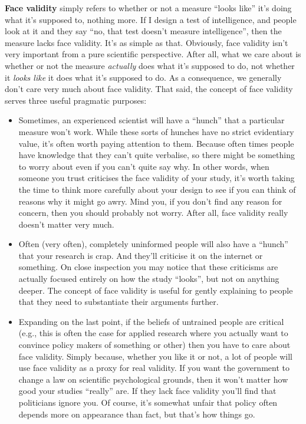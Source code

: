 \documentclass[
]{book}
\providecommand{\tightlist}{%
  \setlength{\itemsep}{0pt}\setlength{\parskip}{0pt}}
\begin{document}
\textbf{Face validity} simply refers to whether or not a measure ``looks like'' it's doing what it's supposed to, nothing more. If I design a test of intelligence, and people look at it and they say ``no, that test doesn't measure intelligence'', then the measure lacks face validity. It's as simple as that. Obviously, face validity isn't very important from a pure scientific perspective. After all, what we care about is whether or not the measure \emph{actually} does what it's supposed to do, not whether it \emph{looks like} it does what it's supposed to do. As a consequence, we generally don't care very much about face validity. That said, the concept of face validity serves three useful pragmatic purposes:

\begin{itemize}
\tightlist
\item
  Sometimes, an experienced scientist will have a ``hunch'' that a particular measure won't work. While these sorts of hunches have no strict evidentiary value, it's often worth paying attention to them. Because often times people have knowledge that they can't quite verbalise, so there might be something to worry about even if you can't quite say why. In other words, when someone you trust criticises the face validity of your study, it's worth taking the time to think more carefully about your design to see if you can think of reasons why it might go awry. Mind you, if you don't find any reason for concern, then you should probably not worry. After all, face validity really doesn't matter very much.
\item
  Often (very often), completely uninformed people will also have a ``hunch'' that your research is crap. And they'll criticise it on the internet or something. On close inspection you may notice that these criticisms are actually focused entirely on how the study ``looks'', but not on anything deeper. The concept of face validity is useful for gently explaining to people that they need to substantiate their arguments further.
\item
  Expanding on the last point, if the beliefs of untrained people are critical (e.g., this is often the case for applied research where you actually want to convince policy makers of something or other) then you have to care about face validity. Simply because, whether you like it or not, a lot of people will use face validity as a proxy for real validity. If you want the government to change a law on scientific psychological grounds, then it won't matter how good your studies ``really'' are. If they lack face validity you'll find that politicians ignore you. Of course, it's somewhat unfair that policy often depends more on appearance than fact, but that's how things go.
\end{itemize}
\end{document}
